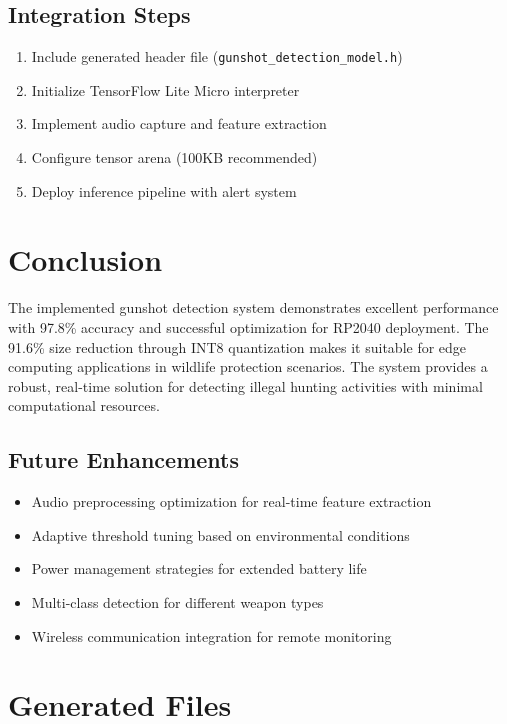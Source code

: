 \documentclass[12pt]{article}
\begin{document}
\subsection{Integration Steps}
\begin{enumerate}
    \item Include generated header file (\texttt{gunshot\_detection\_model.h})
    \item Initialize TensorFlow Lite Micro interpreter
    \item Implement audio capture and feature extraction
    \item Configure tensor arena (100KB recommended)
    \item Deploy inference pipeline with alert system
\end{enumerate}

\section{Conclusion}

The implemented gunshot detection system demonstrates excellent performance with 97.8\% accuracy and successful optimization for RP2040 deployment. The 91.6\% size reduction through INT8 quantization makes it suitable for edge computing applications in wildlife protection scenarios. The system provides a robust, real-time solution for detecting illegal hunting activities with minimal computational resources.

\subsection{Future Enhancements}
\begin{itemize}
    \item Audio preprocessing optimization for real-time feature extraction
    \item Adaptive threshold tuning based on environmental conditions
    \item Power management strategies for extended battery life
    \item Multi-class detection for different weapon types
    \item Wireless communication integration for remote monitoring
\end{itemize}

\section{Generated Files}
\end{document}
